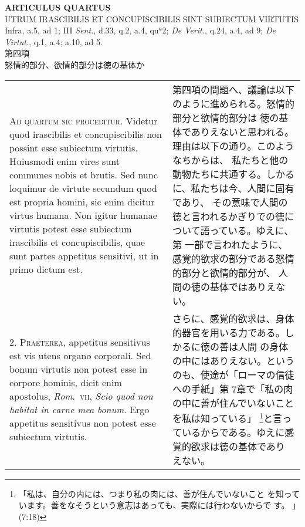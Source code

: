 \documentclass[10pt]{jsarticle}
\begin{document}
\begin{center}
{\Large {\bf ARTICULUS QUARTUS}}\\
{\large UTRUM IRASCIBILIS ET CONCUPISCIBILIS SINT SUBIECTUM VIRTUTIS}\\
{\footnotesize Infra, a.5, ad 1; III {\itshape Sent.}, d.33, q.2, a.4, qu$^{a}$2; {\itshape De Verit.}, q.24, a.4, ad 9; {\itshape De Virtut.}, q.1, a.4; a.10, ad 5.}\\
{\Large 第四項\\怒情的部分、欲情的部分は徳の基体か}
\end{center}

\begin{longtable}{p{21em}p{21em}}

{\scshape Ad quartum sic proceditur}. Videtur quod irascibilis et
concupiscibilis non possint esse subiectum virtutis. Huiusmodi enim
vires sunt communes nobis et brutis. Sed nunc loquimur de virtute
secundum quod est propria homini, sic enim dicitur virtus humana. Non
igitur humanae virtutis potest esse subiectum irascibilis et
concupiscibilis, quae sunt partes appetitus sensitivi, ut in primo
dictum est.

&

第四項の問題へ、議論は以下のように進められる。怒情的部分と欲情的部分は
徳の基体でありえないと思われる。理由は以下の通り。このようなちからは、
私たちと他の動物たちに共通する。しかるに、私たちは今、人間に固有であり、
その意味で人間の徳と言われるかぎりでの徳について語っている。ゆえに、第
一部で言われたように、感覚的欲求の部分である怒情的部分と欲情的部分が、
人間の徳の基体ではありえない。

\\



2. {\scshape Praeterea}, appetitus sensitivus est vis utens organo
corporali. Sed bonum virtutis non potest esse in corpore hominis,
dicit enim apostolus, {\itshape Rom}.~{\scshape vii}, {\itshape Scio
quod non habitat in carne mea bonum}. Ergo appetitus sensitivus non
potest esse subiectum virtutis.

&

さらに、感覚的欲求は、身体的器官を用いる力である。しかるに徳の善は人間
の身体の中にはありえない。というのも、使途が「ローマの信徒への手紙」第
7章で「私の肉の中に善が住んでいないことを私は知っている」
\footnote{「私は、自分の内には、つまり私の肉には、善が住んでいないこと
を知っています。善をなそうという意志はあっても、実際には行わないからで
す。 」(7:18)}と言っているからである。ゆえに感覚的欲求は徳の基体であり
えない。


\end{longtable}
\end{document}

